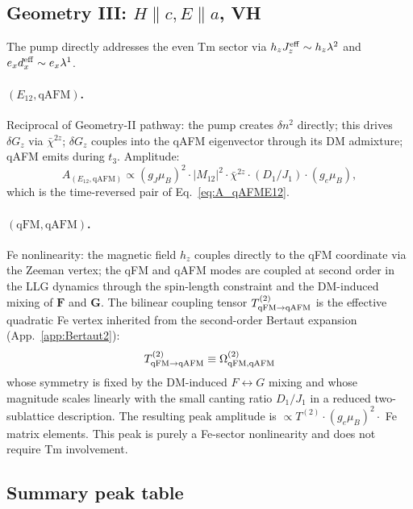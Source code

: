 \documentclass[reprint,amsmath,amssymb,aps,prb,longbibliography]{revtex4-2}
\newcommand{\bfF}{\mathbf{F}}
\newcommand{\bfG}{\mathbf{G}}
\begin{document}
\subsection{Geometry III: \texorpdfstring{$H\parallel c, E\parallel a$, VH}{H||c, E||a, VH}}

The pump directly addresses the even Tm sector via $h_z J_z^{\rm eff}\sim
h_z\lambda^2$ and $e_x d_x^{\rm eff}\sim e_x\lambda^1$.

\paragraph{$(E_{12}, \mathrm{qAFM})$.} Reciprocal of Geometry-II
pathway: the pump creates $\delta n^2$ directly; this drives $\delta G_z$
via $\bar\chi^{2z}$; $\delta G_z$ couples into the qAFM eigenvector
through its DM admixture; qAFM emits during $t_3$. Amplitude:
\begin{equation}
A_{(E_{12}, \mathrm{qAFM})} \propto
(g_J\mu_B)^2\cdot |M_{12}|^2\cdot\bar\chi^{2z}\cdot (D_1/J_1)\cdot (g_e\mu_B),
\label{eq:A_E12qAFM}
\end{equation}
which is the time-reversed pair of Eq.~\eqref{eq:A_qAFME12}.

\paragraph{$(\mathrm{qFM}, \mathrm{qAFM})$.} Fe nonlinearity: the
magnetic field $h_z$ couples directly to the qFM coordinate via the
Zeeman vertex; the qFM and qAFM modes are coupled at second order in the
LLG dynamics through the spin-length constraint and the DM-induced
mixing of $\bfF$ and $\bfG$. The bilinear coupling tensor
$T^{(2)}_{\rm qFM\to qAFM}$ is the effective quadratic Fe vertex inherited
from the second-order Bertaut expansion (App.~\ref{app:Bertaut2}):
\begin{equation}
T^{(2)}_{\rm qFM\to qAFM} \equiv \Omega^{(2)}_{\rm qFM,qAFM}
\label{eq:TqFMqAFM}
\end{equation}
whose symmetry is fixed by the DM-induced $F\leftrightarrow G$ mixing and
whose magnitude scales linearly with the small canting ratio $D_1/J_1$ in
a reduced two-sublattice description. The resulting peak amplitude is
$\propto T^{(2)}\cdot (g_e\mu_B)^2\cdot$ Fe matrix elements. This peak is
purely a Fe-sector nonlinearity and does not require Tm involvement.

\subsection{Summary peak table}
\end{document}
